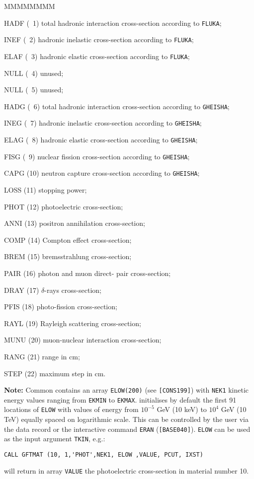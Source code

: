 \begin{DLtt}{MMMMMMMM}
\item[HADF (~1)] total hadronic interaction cross-section according
to {\tt FLUKA};
\item[INEF (~2)] hadronic inelastic cross-section according
to {\tt FLUKA};
\item[ELAF (~3)] hadronic elastic cross-section according
to {\tt FLUKA};
\item[NULL (~4)] unused;
\item[NULL (~5)] unused;
\item[HADG (~6)] total hadronic interaction cross-section according
to {\tt GHEISHA};
\item[INEG (~7)] hadronic inelastic cross-section according
to {\tt GHEISHA};
\item[ELAG (~8)] hadronic elastic cross-section according
to {\tt GHEISHA};
\item[FISG (~9)] nuclear fission cross-section according
to {\tt GHEISHA};
\item[CAPG (10)] neutron capture cross-section according
to {\tt GHEISHA};
\item[LOSS (11)] stopping power;
\item[PHOT (12)] photoelectric cross-section;
\item[ANNI (13)] positron annihilation cross-section;
\item[COMP (14)] Compton effect cross-section;
\item[BREM (15)] bremsstrahlung cross-section;
\item[PAIR (16)] photon and muon direct- \Pem\Pep pair cross-section;
\item[DRAY (17)] $\delta$-rays cross-section;
\item[PFIS (18)] photo-fission cross-section;
\item[RAYL (19)] Rayleigh scattering cross-section;
\item[MUNU (20)] muon-nuclear interaction cross-section;
\item[RANG (21)] range in cm;
\item[STEP (22)] maximum step in cm.
\end{DLtt}
 
{\bf Note:}
Common  contains an array {\tt ELOW(200)}
(see {\tt [CONS199]})
with {\tt NEK1} kinetic energy values
ranging from {\tt EKMIN} to {\tt EKMAX}.  initialises by
default the first 91 locations of {\tt ELOW} with values of energy
from $10^{-5}$ GeV (10 keV) to $10^{4}$ GeV (10 TeV) equally spaced on
logarithmic scale. This can be controlled by the user via the data
record or the interactive command {\tt ERAN} ({\tt [BASE040]}).
{\tt ELOW} can be used as the input argument {\tt TKIN}, e.g.:
\begin{verbatim}
CALL GFTMAT (10, 1,'PHOT',NEK1, ELOW ,VALUE, PCUT, IXST)
\end{verbatim}
will return in array {\tt VALUE} the photoelectric cross-section
in material number 10.

